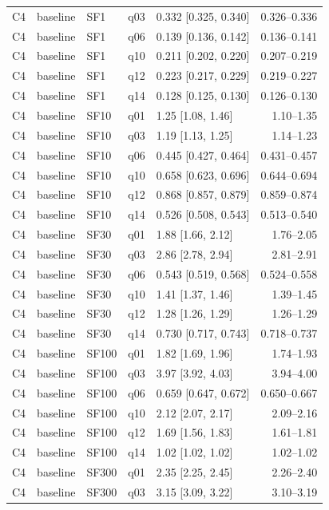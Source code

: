 \begin{longtable}{lllllr}
C4 & baseline & SF1 & q03 & 0.332 [0.325, 0.340] & 0.326--0.336 \\
C4 & baseline & SF1 & q06 & 0.139 [0.136, 0.142] & 0.136--0.141 \\
C4 & baseline & SF1 & q10 & 0.211 [0.202, 0.220] & 0.207--0.219 \\
C4 & baseline & SF1 & q12 & 0.223 [0.217, 0.229] & 0.219--0.227 \\
C4 & baseline & SF1 & q14 & 0.128 [0.125, 0.130] & 0.126--0.130 \\
C4 & baseline & SF10 & q01 & 1.25 [1.08, 1.46] & 1.10--1.35 \\
C4 & baseline & SF10 & q03 & 1.19 [1.13, 1.25] & 1.14--1.23 \\
C4 & baseline & SF10 & q06 & 0.445 [0.427, 0.464] & 0.431--0.457 \\
C4 & baseline & SF10 & q10 & 0.658 [0.623, 0.696] & 0.644--0.694 \\
C4 & baseline & SF10 & q12 & 0.868 [0.857, 0.879] & 0.859--0.874 \\
C4 & baseline & SF10 & q14 & 0.526 [0.508, 0.543] & 0.513--0.540 \\
C4 & baseline & SF30 & q01 & 1.88 [1.66, 2.12] & 1.76--2.05 \\
C4 & baseline & SF30 & q03 & 2.86 [2.78, 2.94] & 2.81--2.91 \\
C4 & baseline & SF30 & q06 & 0.543 [0.519, 0.568] & 0.524--0.558 \\
C4 & baseline & SF30 & q10 & 1.41 [1.37, 1.46] & 1.39--1.45 \\
C4 & baseline & SF30 & q12 & 1.28 [1.26, 1.29] & 1.26--1.29 \\
C4 & baseline & SF30 & q14 & 0.730 [0.717, 0.743] & 0.718--0.737 \\
C4 & baseline & SF100 & q01 & 1.82 [1.69, 1.96] & 1.74--1.93 \\
C4 & baseline & SF100 & q03 & 3.97 [3.92, 4.03] & 3.94--4.00 \\
C4 & baseline & SF100 & q06 & 0.659 [0.647, 0.672] & 0.650--0.667 \\
C4 & baseline & SF100 & q10 & 2.12 [2.07, 2.17] & 2.09--2.16 \\
C4 & baseline & SF100 & q12 & 1.69 [1.56, 1.83] & 1.61--1.81 \\
C4 & baseline & SF100 & q14 & 1.02 [1.02, 1.02] & 1.02--1.02 \\
C4 & baseline & SF300 & q01 & 2.35 [2.25, 2.45] & 2.26--2.40 \\
C4 & baseline & SF300 & q03 & 3.15 [3.09, 3.22] & 3.10--3.19 \\

\end{longtable}
